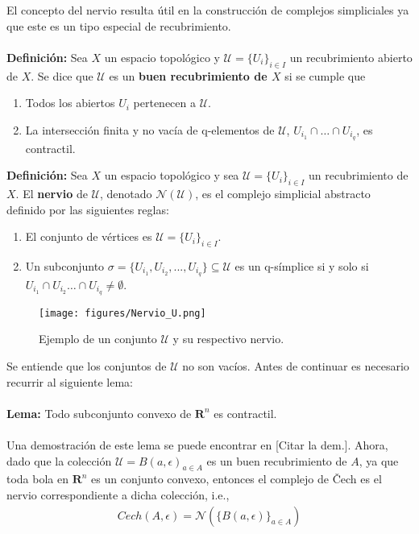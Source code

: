 \documentclass[a4paper,11pt]{article}
\begin{document}
El concepto del nervio resulta útil en la construcción de complejos simpliciales ya que este es un tipo especial de recubrimiento.\\
\\
\textbf{Definición:} Sea $X$ un espacio topológico y $\mathcal{U}=\{U_{i}\}_{i \in I}$ un recubrimiento abierto de $X$. Se dice que $\mathcal{U}$ es un \textbf{buen recubrimiento de $X$} si se cumple que
\begin{enumerate}
    \item Todos los abiertos $U_{i}$ pertenecen a $\mathcal{U}$.
    \item La intersección finita y no vacía de q-elementos de $\mathcal{U}$, $U_{i_{1}}\cap \ldots \cap U_{i_{q}}$, es contractil.
\end{enumerate}
\textbf{Definición:} Sea $X$ un espacio topológico y sea $\mathcal{U}=\{U_{i}\}_{i \in I}$ un recubrimiento de $X$. El \textbf{nervio} de $\mathcal{U}$, denotado \textbf{$\mathcal{N}(\mathcal{U})$}, es el complejo simplicial abstracto definido por las siguientes reglas:
\begin{enumerate}
    \item El conjunto de vértices es $\mathcal{U}=\{U_{i}\}_{i \in I}$.
    \item Un subconjunto $\sigma = \{U_{i_{1}}, U_{i_{2}}, ... ,U_{i_{q}}\} \subseteq \mathcal{U}$ es un q-símplice si y solo si $U_{i_{1}}\cap U_{i_{2}} \ldots \cap U_{i_{q}} \neq \emptyset$.
\end{enumerate}
\begin{figure}[!htb]
  \centering
  \texttt{[image: figures/Nervio\_U.png]}
  \caption{Ejemplo de un conjunto $\mathcal{U}$ y su respectivo nervio.}
\end{figure}
Se entiende que los conjuntos de $\mathcal{U}$ no son vacíos. Antes de continuar es necesario recurrir al siguiente lema:\\
\\
\textbf{Lema:} Todo subconjunto convexo de $\mathbf{R}^n$ es contractil.\\
\\
Una demostración de este lema se puede encontrar en [Citar la dem.]. Ahora, dado que la colección $\mathcal{U} = {B(a,\epsilon)}_{a \in A}$ es un buen recubrimiento de $A$, ya que toda bola en $\mathbf{R}^n$ es un conjunto convexo, entonces el complejo de Čech es el nervio correspondiente a dicha colección, i.e., 
\begin{align*}
    Cech(A,\epsilon) = \mathcal{N}(\{B(a,\epsilon)\}_{a \in A})
\end{align*}
\end{document}
